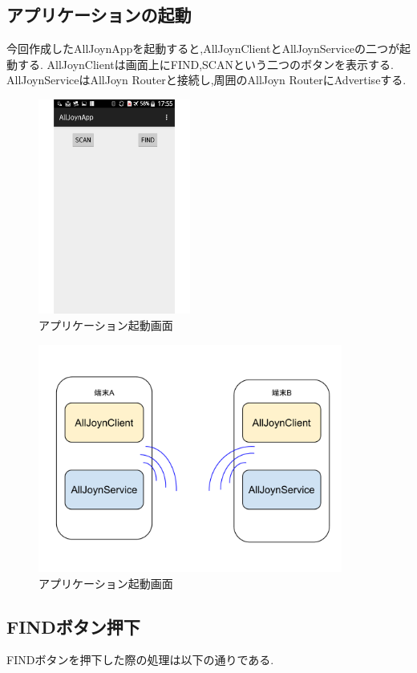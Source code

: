 \subsection{アプリケーションの起動}
今回作成したAllJoynAppを起動すると,AllJoynClientとAllJoynServiceの二つが起動する.
AllJoynClientは画面上にFIND,SCANという二つのボタンを表示する.
AllJoynServiceはAllJoyn Routerと接続し,周囲のAllJoyn RouterにAdvertiseする.

\begin{figure}[htbp]
\centering
\includegraphics[width=5cm]{fig/screen1.pdf}
\caption{アプリケーション起動画面}
\end{figure}

\begin{figure}[htbp]
\centering
\includegraphics[width=10cm]{fig/appstart.pdf}
\caption{アプリケーション起動画面}
\end{figure}


\subsection{FINDボタン押下}
FINDボタンを押下した際の処理は以下の通りである.

